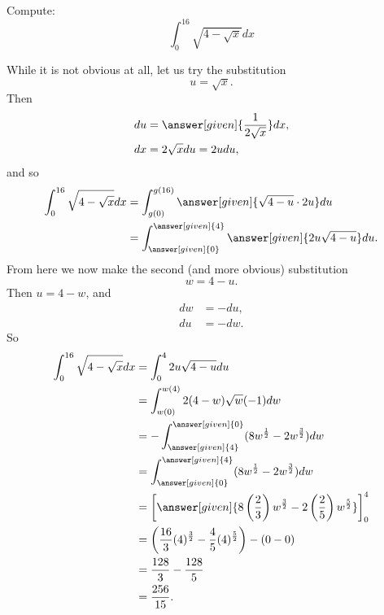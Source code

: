 \documentclass{ximera}
\begin{document}
\begin{example}
Compute:
\[
\int_0^{16} \sqrt{4 - \sqrt{x}} dx
\]
\begin{explanation}
While it is not obvious at all, let us try the substitution
\[
u = \sqrt{x}.
\]
Then
\begin{align*}
du &= \answer[given]{\frac{1}{2 \sqrt{x}}} dx,\\
dx &= 2 \sqrt{x} du = 2u du,
\end{align*}
and so
\begin{align*}
\int_0^{16} \sqrt{4 - \sqrt{x}} dx &= \int_{g(0)}^{g(16)} \answer[given]{\sqrt{4-u} \cdot 2u} du  \\
&= \int_{\answer[given]{0}}^{\answer[given]{4}} \answer[given]{2u \sqrt{4-u}} du.
\end{align*}
From here we now make the second (and more obvious) substitution
\[
w = 4-u.
\]
Then $u = 4-w$, and
\begin{align*}
dw &= - du,\\
du &= - dw.
\end{align*}
So
\begin{align*}
\int_0^{16} \sqrt{4 - \sqrt{x}} dx &= \int_0^4 2u \sqrt{4-u} du  \\
&= \int_{w(0)}^{w(4)} 2 (4-w) \sqrt{w} (-1) dw  \\
&= - \int_{\answer[given]{4}}^{\answer[given]{0}} ( 8w^{\frac{1}{2}} - 2w^{\frac{3}{2}} ) dw  \\
&= \int_{\answer[given]{0}}^{\answer[given]{4}} ( 8w^{\frac{1}{2}} - 2w^{\frac{3}{2}} ) dw  \\
&= \bigg[  \answer[given]{8 \left( \frac{2}{3} \right) w^{\frac{3}{2}} - 2 \left( \frac{2}{5} \right) w^{\frac{5}{2}}} \bigg]_{0}^{4}  \\
&= \left( \frac{16}{3} (4)^{\frac{3}{2}} - \frac{4}{5} (4)^{\frac{5}{2}} \right) - \left( 0 - 0 \right)  \\
&= \frac{128}{3} - \frac{128}{5}   \\
&= \frac{256}{15}.
\end{align*}
\end{explanation}
\end{example}
\end{document}
